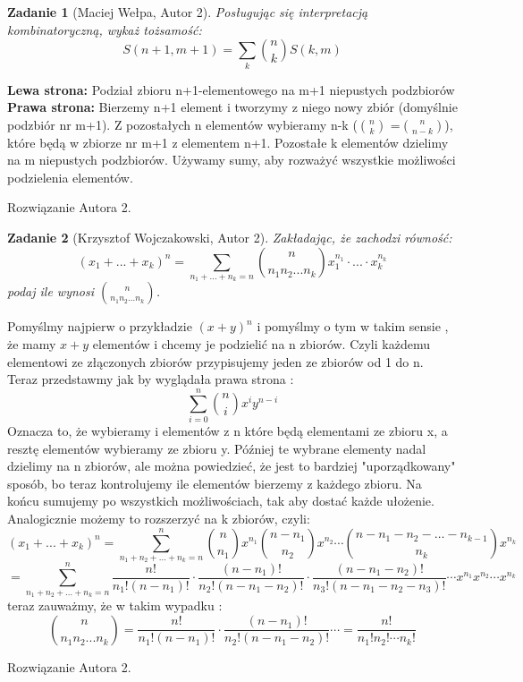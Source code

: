 \documentclass{mwart}
\newtheorem{zad}{Zadanie}[section]
\begin{document}
\begin{zad}[Maciej Wełpa, Autor 2]
    Posługując się interpretacją kombinatoryczną, wykaż tożsamość:
    \[S(n+1,m+1) = \sum_k \binom{n}{k}S(k,m)\]
\end{zad}
\begin{mdframed}
    \textbf{Lewa strona:} Podział zbioru n+1-elementowego na m+1 niepustych podzbiorów\\
    \textbf{Prawa strona:} Bierzemy n+1 element i tworzymy z niego nowy zbiór (domyślnie podzbiór nr m+1). Z pozostałych
    n elementów wybieramy n-k (\(\binom{n}{k}\) =\(\binom{n}{n-k}\)), które będą w zbiorze nr m+1 z elementem n+1. Pozostałe k elementów dzielimy na m niepustych podzbiorów. Używamy sumy, aby rozważyć wszystkie możliwości podzielenia elementów.
\end{mdframed}
\begin{mdframed}
    Rozwiązanie Autora 2.
\end{mdframed}




\begin{zad}[Krzysztof Wojczakowski, Autor 2]
    Zakładając, że zachodzi równość:
    \[
        (x_1 + ... + x_k)^n = \sum_{n_1+...+n_k=n}\binom{n}{n_1 n_2 ... n_k}x_1^{n_1}\cdot...\cdot x_k^{n_k}
    \]
    podaj ile wynosi $\binom{n}{n_1 n_2 ... n_k}$.
\end{zad}
\begin{mdframed}
    Pomyślmy najpierw o przykładzie 
    \( (x + y)^n \) i pomyślmy o tym w takim sensie , że mamy $x+y$ elementów i chcemy je podzielić na n zbiorów. Czyli 
    każdemu elementowi ze złączonych zbiorów przypisujemy jeden ze zbiorów od 1 do n.
    Teraz przedstawmy jak by wyglądała prawa strona : \newline
    \[
    \sum_{i=0}^{n} \binom{n}{i} x^i y^{n-i} 
    \]
    Oznacza to, że wybieramy i elementów z n które będą elementami ze zbioru x, a resztę elementów wybieramy ze zbioru y. Później te wybrane elementy nadal dzielimy na n zbiorów, ale można powiedzieć, że jest to bardziej "uporządkowany" sposób, bo teraz kontrolujemy ile elementów bierzemy z każdego zbioru.
    Na końcu sumujemy po wszystkich możliwościach, tak aby dostać każde ułożenie.
    Analogicznie możemy to rozszerzyć na k zbiorów, czyli:
    \[
        (x_1 + ... + x_k)^n =\sum_{n_1 + n_2 + \dots + n_k = n}^{n} 
\binom{n}{n_1} x^{n_1} 
\binom{n - n_1}{n_2} x^{n_2} 
\cdots 
\binom{n - n_1 - n_2 - \dots - n_{k-1}}{n_k} x^{n_k}
\]
\[
= \sum_{n_1 + n_2 + \dots + n_k = n}^{n}
\frac{n!}{n_1! (n - n_1)!}
\cdot 
\frac{(n - n_1)!}{n_2! (n - n_1 - n_2)!}
\cdot 
\frac{(n - n_1 - n_2)!}{n_3! (n - n_1 - n_2 - n_3)!}
\cdots x^{n_1} x^{n_2} \cdots x^{n_k} \]
 teraz zauważmy, że w takim wypadku :
    \[
        \binom{n}{n_1 n_2 ... n_k} = \frac{n!}{n_1! (n - n_1)!} \cdot \frac{(n - n_1)!}{n_2! (n - n_1 - n_2)!} \cdots = \frac{n!}{n_1! n_2! \cdots n_k!}
    \]

\end{mdframed}
\begin{mdframed}
    Rozwiązanie Autora 2.
\end{mdframed}
\end{document}
